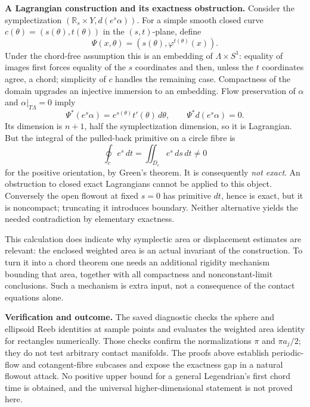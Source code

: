 \documentclass[11pt]{article}
\begin{document}
\textbf{A Lagrangian construction and its exactness obstruction.}
Consider the symplectization $(\mathbb R_s\times Y,d(e^s\alpha))$.
For a simple smooth closed curve $c(\theta)=(s(\theta),t(\theta))$ in the
$(s,t)$-plane, define
\[
 \Psi(x,\theta)=(s(\theta),\varphi^{t(\theta)}(x)).
\]
Under the chord-free assumption this is an embedding of
$\Lambda\times S^1$: equality of images first forces equality of the $s$
coordinates and then, unless the $t$ coordinates agree, a chord; simplicity
of $c$ handles the remaining case.  Compactness of the domain upgrades an
injective immersion to an embedding.  Flow preservation of $\alpha$ and
$\alpha|_{T\Lambda}=0$ imply
\[
 \Psi^*(e^s\alpha)=e^{s(\theta)}t'(\theta)\,d\theta,
 \qquad \Psi^*d(e^s\alpha)=0.
\]
Its dimension is $n+1$, half the symplectization dimension, so it is
Lagrangian.  But the integral of the pulled-back primitive on a circle fibre is
\[
 \oint_c e^s\,dt=\iint_{D_c}e^s\,ds\,dt\ne0
\]
for the positive orientation, by Green's theorem.  It is consequently
\emph{not exact}.  An obstruction to closed exact Lagrangians cannot be applied
to this object.  Conversely the open flowout at fixed $s=0$ has primitive
$dt$, hence is exact, but it is noncompact; truncating it introduces boundary.
Neither alternative yields the needed contradiction by elementary exactness.

This calculation does indicate why symplectic area or displacement estimates
are relevant: the enclosed weighted area is an actual invariant of the
construction.  To turn it into a chord theorem one needs an additional
rigidity mechanism bounding that area, together with all compactness and
nonconstant-limit conclusions.  Such a mechanism is extra input, not a
consequence of the contact equations alone.

\textbf{Verification and outcome.}
The saved diagnostic checks the sphere and ellipsoid Reeb identities at
sample points and evaluates the weighted area identity for rectangles
numerically.  Those checks confirm the normalizations $\pi$ and
$\pi a_j/2$; they do not test arbitrary contact manifolds.  The proofs above
establish periodic-flow and cotangent-fibre subcases and expose the exactness
gap in a natural flowout attack.  No positive upper bound for a general
Legendrian's first chord time is obtained, and the universal higher-dimensional
statement is not proved here.
\end{document}
